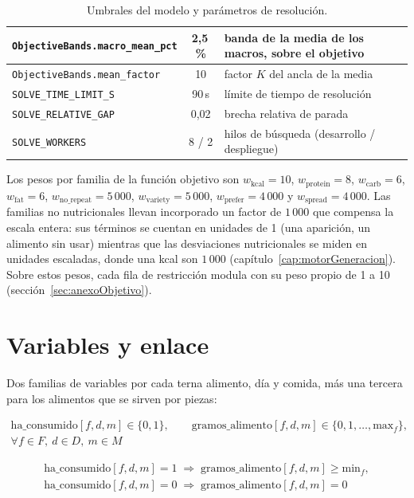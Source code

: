 \begin{table}[htbp]
\begin{tabular}{|l|c|p{5.8cm}|}
\hline
\texttt{ObjectiveBands.macro\_mean\_pct} & 2,5\,\% & banda de la media de los macros, sobre el objetivo \\
\hline
\texttt{ObjectiveBands.mean\_factor} & 10 & factor $K$ del ancla de la media \\
\hline
\texttt{SOLVE\_TIME\_LIMIT\_S} & 90\,s & límite de tiempo de resolución \\
\hline
\texttt{SOLVE\_RELATIVE\_GAP} & 0,02 & brecha relativa de parada \\
\hline
\texttt{SOLVE\_WORKERS} & 8 / 2 & hilos de búsqueda (desarrollo / despliegue) \\
\hline
\end{tabular}
\caption{Umbrales del modelo y parámetros de resolución.}
\label{tab:anexoUmbrales}
\end{table}

Los pesos por familia de la función objetivo son $w_{\text{kcal}} = 10$, $w_{\text{protein}} = 8$, $w_{\text{carb}} = 6$, $w_{\text{fat}} = 6$, $w_{\text{no\_repeat}} = 5\,000$, $w_{\text{variety}} = 5\,000$, $w_{\text{prefer}} = 4\,000$ y $w_{\text{spread}} = 4\,000$. Las familias no nutricionales llevan incorporado un factor de $1\,000$ que compensa la escala entera: sus términos se cuentan en unidades de 1 (una aparición, un alimento sin usar) mientras que las desviaciones nutricionales se miden en unidades escaladas, donde una kcal son $1\,000$ (capítulo~\ref{cap:motorGeneracion}). Sobre estos pesos, cada fila de restricción modula con su peso propio de 1 a 10 (sección~\ref{sec:anexoObjetivo}).

\FloatBarrier
\section{Variables y enlace}
\label{sec:anexoVariables}

Dos familias de variables por cada terna alimento, día y comida, más una tercera para los alimentos que se sirven por piezas:

\begin{gather*}
\text{ha\_consumido}[f,d,m] \in \{0, 1\}, \qquad \text{gramos\_alimento}[f,d,m] \in \{0, 1, \dots, \text{max}_f\}, \\
\forall f \in F,\ d \in D,\ m \in M
\end{gather*}

\begin{gather*}
\text{ha\_consumido}[f,d,m] = 1 \;\Rightarrow\; \text{gramos\_alimento}[f,d,m] \ge \text{min}_f, \\
\text{ha\_consumido}[f,d,m] = 0 \;\Rightarrow\; \text{gramos\_alimento}[f,d,m] = 0
\end{gather*}

